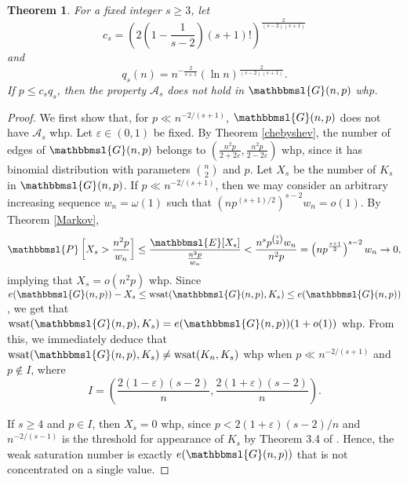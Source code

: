 \documentclass[hidelinks, 11pt]{article}
\theoremstyle{plain}
\newtheorem{theorem}{Theorem}[section]
\theoremstyle{definition}
\begin{document}
\begin{theorem}\label{lower-ii}
For a  fixed integer  $s\geq 3$,  let
$$c_s=\left(2\left(1-\frac{1}{s-2}\right)(s+1)!\right)^{\frac{2}{(s-2)(s+1)}}$$  and $$q_s(n)=n^{-\frac2{s+1}}(\ln n)^\frac{2}{(s-2)(s+1)}.$$
If $p\leq c_sq_s$, then   the property   $\mathcal{A}_s$ does not hold in $\mathbbmsl{G}(n, p)$ whp.
\end{theorem}


\begin{proof}
We first show that, for $p\ll n^{-2/(s+1)}$,   $\mathbbmsl{G}(n,p)$ does not have $\mathcal{A}_s$ whp. Let $\varepsilon\in(0,1)$ be fixed. By   Theorem \ref{chebyshev}, the number of edges of $\mathbbmsl{G}(n,p)$ belongs to $(\tfrac{n^2p}{2+2\varepsilon},\tfrac{n^2p}{2-2\varepsilon})$  whp,   since it has binomial distribution with parameters ${n\choose 2}$ and $p$.
Let $X_s$ be the number of $K_s$  in $\mathbbmsl{G}(n,p)$. If $p\ll n^{-2/(s+1)}$, then we may  consider an arbitrary increasing sequence $w_n=\omega(1)$ such that $(np^{(s+1)/2})^{s-2}w_n=o(1)$. By Theorem \ref{Markov},
$$\mathbbmsl{P}\left[X_s>\frac{n^2p}{w_n}\right]\leq\frac{\mathbbmsl{E}[X_s]}{\frac{n^2p}{w_n}}<\frac{n^sp^{s\choose 2}w_n}{n^2p}=\left(np^{\frac{s+1}{2}}\right)^{s-2}w_n\to 0,$$
implying that $X_s=o(n^2p)$ whp. Since $e(\mathbbmsl{G}(n, p))-X_s\leq\mathrm{wsat}(\mathbbmsl{G}(n, p), K_s)\leq e(\mathbbmsl{G}(n, p))$, we get   that  $\mathrm{wsat}(\mathbbmsl{G}(n, p), K_s)=e(\mathbbmsl{G}(n, p))(1+o(1))$ whp. From this, we immediately deduce  that   $\mathrm{wsat}(\mathbbmsl{G}(n, p), K_s)\neq\mathrm{wsat}(K_n, K_s)$ whp when  $p\ll n^{-2/(s+1)}$ and  $p\notin I$, where $$I=\left(\frac{2(1-\varepsilon)(s-2)}{n}, \frac{2(1+\varepsilon)(s-2)}{n}\right).$$


If  $s\geq4$ and $p\in I$, then  $X_s=0$ whp, since $p<2(1+\varepsilon)(s-2)/n$ and $n^{-2/(s-1)}$ is the threshold for appearance of $K_s$   by  Theorem 3.4 of   \cite{RG}. Hence,    the weak saturation number is exactly $e(\mathbbmsl{G}(n, p))$ that is not concentrated on a single value.




\end{proof}
\end{document}
